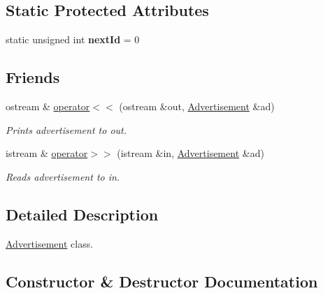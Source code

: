 \subsection*{Static Protected Attributes}
\begin{DoxyCompactItemize}
\item 
\hypertarget{class_advertisement_a0b5a0f2ec778aba63d0dd24bb3b2675b}{}static unsigned int {\bfseries next\+Id} = 0\label{class_advertisement_a0b5a0f2ec778aba63d0dd24bb3b2675b}

\end{DoxyCompactItemize}
\subsection*{Friends}
\begin{DoxyCompactItemize}
\item 
ostream \& \hyperlink{class_advertisement_af6ba8e9ebe3c64e17263cbbcaa8bbb59}{operator$<$$<$} (ostream \&out, \hyperlink{class_advertisement}{Advertisement} \&ad)
\begin{DoxyCompactList}\small\item\em Prints advertisement to out. \end{DoxyCompactList}\item 
istream \& \hyperlink{class_advertisement_a5180e86255ebd01c83666f431b910bb4}{operator$>$$>$} (istream \&in, \hyperlink{class_advertisement}{Advertisement} \&ad)
\begin{DoxyCompactList}\small\item\em Reads advertisement to in. \end{DoxyCompactList}\end{DoxyCompactItemize}


\subsection{Detailed Description}
\hyperlink{class_advertisement}{Advertisement} class. 

\subsection{Constructor \& Destructor Documentation}
\hypertarget{class_advertisement_aa39584aae7c125c74a9dfe97409ae326}{}
